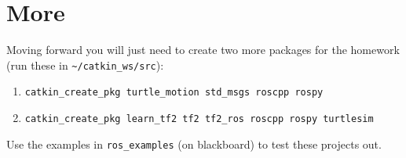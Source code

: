 \documentclass[11pt]{article}
\begin{document}
\section{More}
Moving forward you will just need to create two more packages for the homework (run these in \texttt{\textasciitilde/catkin\_ws/src}):
\begin{enumerate}
\item \texttt{catkin\_create\_pkg turtle\_motion std\_msgs roscpp rospy}
\item \texttt{catkin\_create\_pkg learn\_tf2 tf2 tf2\_ros roscpp rospy turtlesim}
\end{enumerate}
Use the examples in \texttt{ros\_examples} (on blackboard) to test these projects out.
\end{document}
